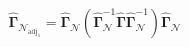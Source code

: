 \begin{equation}
    \hat{\boldsymbol{\Gamma}}_{\mathcal{N}_{\mathrm{adj}_{1}}}
    =
    \hat{\boldsymbol{\Gamma}}_{\mathcal{N}}
    \left(
    \hat{\boldsymbol{\Gamma}}_{\mathcal{N}}^{-1}
    \hat{\boldsymbol{\Gamma}}
    \hat{\boldsymbol{\Gamma}}_{\mathcal{N}}^{-1}
    \right)
    \hat{\boldsymbol{\Gamma}}_{\mathcal{N}}
    \label{eq:gammaMatrix-gammacap-mvn-adj-estimator}   
\end{equation}
